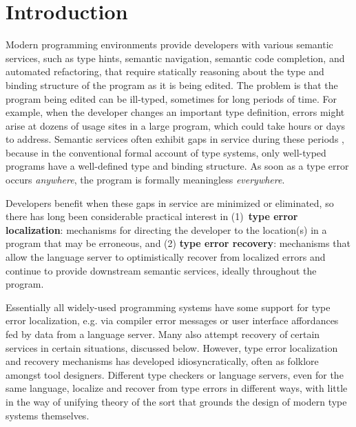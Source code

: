 \section{Introduction}
\label{sec:introduction}


Modern programming environments provide developers with 
various semantic services, such as type hints, semantic navigation, semantic code completion, and automated refactoring, that require statically reasoning about the type and binding structure of the program as it is being edited. 
The problem is that the program being edited can be ill-typed, sometimes for long periods of time. 
For example, when the developer changes an important type definition, errors might arise at dozens of usage sites in a large program, which could take hours or days to address. Semantic services often exhibit gaps in service during these periods \cite{HazelnutSNAPL}, because in the conventional formal account of type systems, only well-typed programs have a well-defined type and binding structure. As soon as a type error occurs \emph{anywhere}, the program is formally meaningless \emph{everywhere}.

Developers benefit when these gaps in service are minimized or eliminated, so there has long been considerable practical interest in (1)~\textbf{type error localization}: mechanisms for directing the developer to 
the location(s) in a program that may be erroneous, and (2) \textbf{type error recovery}: 
mechanisms that allow the language server to optimistically recover from localized errors and continue to provide downstream semantic services, ideally throughout the program.

Essentially all widely-used programming systems have some support for type error 
localization, e.g. via compiler error messages or user interface affordances fed by data from a language server.
Many also attempt recovery of certain services in certain situations, discussed below. 
However, type error localization and recovery mechanisms has developed idiosyncratically, often as folklore amongst tool designers. Different type checkers or language servers, even for the same language, localize and recover from type errors in different ways, with little in the way of unifying theory of the sort that grounds the design of modern type systems themselves.

